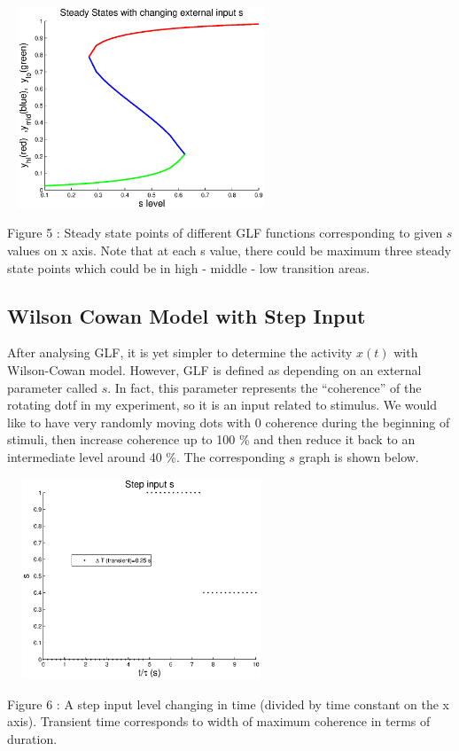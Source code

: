 \documentclass[twocolumn]{article}
\begin{document}
\begin{center}
\includegraphics[width=80mm,height=60mm]{s_vs_steadystate.eps} 
   \begin{footnotesize} Figure 5 : Steady state points of different GLF functions corresponding to given $s$ values on x axis. Note that at each s value, there could be maximum three steady state points which could be in high - middle - low transition areas. \end{footnotesize}
\end{center}


\subsection{Wilson Cowan Model with Step Input}
After analysing GLF, it is yet simpler to determine the activity $x(t)$ with Wilson-Cowan model. However, GLF is defined as depending on an external parameter called $s$. In fact, this parameter represents the ``coherence'' of the rotating dotf in my experiment, so it is an input related to stimulus. We would like to have very randomly moving dots with 0 coherence during the beginning of stimuli, then increase coherence up to 100 \% and then reduce it back to an intermediate level around 40 \%. The corresponding $s$ graph is shown below. 

 \begin{center}
\includegraphics[width=80mm,height=60mm]{step_input.eps} 
   \begin{footnotesize} Figure 6 : A step input level changing in time (divided by time constant on the x axis).  Transient time corresponds to width of maximum coherence in terms of duration. \end{footnotesize}
\end{center}
\end{document}
